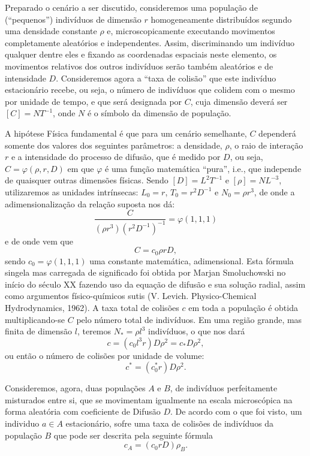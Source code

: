     Preparado o cenário a ser discutido, consideremos uma população de (``pequenos'') indivíduos de dimensão \(r\) homogeneamente distribuídos segundo uma densidade constante \(\rho\) e, microscopicamente executando movimentos completamente aleatórios e independentes. Assim, discriminando um indivíduo qualquer dentre eles e fixando as coordenadas espaciais neste elemento, os movimentos relativos dos outros indivíduos serão também aleatórios e de intensidade \(D\). Consideremos agora a ``taxa de colisão'' que este indivíduo estacionário recebe, ou seja, o número de indivíduos que colidem com o mesmo por unidade de tempo, e que será designada por \(C\), cuja dimensão deverá ser \([C] = NT^{-1}\), onde \(N\) é o símbolo da dimensão de população.

    A hipótese Física fundamental é que para um cenário semelhante, \(C\) dependerá somente dos valores dos seguintes parâmetros: a densidade, \(\rho\), o raio de interação \(r\) e a intensidade do processo de difusão, que é medido por \(D\), ou seja, \(C = \varphi(\rho, r, D)\) em que \(\varphi\) é uma função matemática ``pura'', i.e., que independe de quaisquer outras dimensões físicas. Sendo \([D] = L^{2}T^{-1}\) e \([\rho] = NL^{-3}\), utilizaremos as unidades intrínsecas: \(L_0 = r\), \(T_0 = r^{2}D^{-1}\) e \(N_0 = \rho r^{3}\), de onde a adimensionalização da relação suposta nos dá:
    \[\dfrac{C}{(\rho r^3)(r^2 D^{-1})^{-1}} = \varphi(1,1,1)\]
    e de onde vem que
    \[C = c_0 \rho r D,\]
    sendo \(c_0 =\varphi(1, 1, 1)\) uma constante matemática, adimensional. Esta fórmula singela mas carregada de significado foi obtida por Marjan Smoluchowski no início do século XX fazendo uso da equação de difusão e sua solução radial, assim como argumentos físico-químicos sutis (V. Levich. Physico-Chemical Hydrodynamics, 1962). A taxa total de colisões \(c\) em toda a população é obtida multiplicando-se \(C\) pelo número total de indivíduos. Em uma região grande, mas finita de dimensão \(l\), teremos \(N_\ast = \rho l^{3}\) indivíduos, o que nos dará
    \[c = (c_0 l^{3}r)D\rho^{2} = c_\ast D \rho^{2},\]
    ou então o número de colisões por unidade de volume: \[c^\ast = (c_0^\ast r) D \rho^2.\]

    Consideremos, agora, duas populações \(A\) e \(B\), de indivíduos perfeitamente misturados entre si, que se movimentam igualmente na escala microscópica na forma aleatória com coeficiente de Difusão \(D\). De acordo com o que foi visto, um individuo \(a \in A\) estacionário, sofre uma taxa de colisões de indivíduos da população \(B\) que pode ser descrita pela seguinte fórmula \[c_A = (c_0 r D)\rho_B.\]

